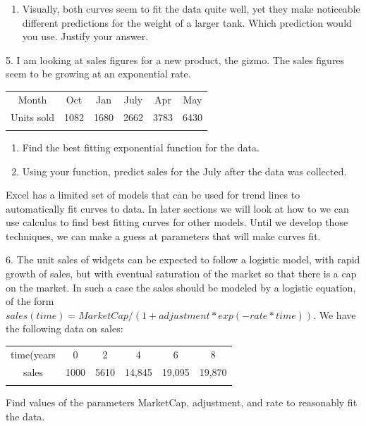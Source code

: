 \documentclass[10pt,]{book}
\theoremstyle{plain}
\theoremstyle{definition}
\theoremstyle{definition}
\newcommand{\hrulethin}  {\noalign{\hrule height 0.04em}}
\newcommand{\hrulemedium}{\noalign{\hrule height 0.07em}}
\newcommand{\hrulethick} {\noalign{\hrule height 0.11em}}
\begin{document}
\begin{exerciselist}
\begin{enumerate}[label=(\alph*)]
\item\hypertarget{li-92}{} Visually, both curves seem to fit the data quite well, yet they make noticeable different predictions for the weight of a larger tank.  Which prediction would you use.  Justify your answer.%
\end{enumerate}
\par\smallskip
\item[5.]\hypertarget{exercise-68}{}  I am looking at sales figures for a new product, the gizmo.  The sales figures seem to be growing at an exponential rate.
%
\leavevmode%
\begin{table}
\centering
\begin{tabular}{cccccc}\hrulethick
Month&Oct&Jan&July&Apr&May\tabularnewline\hrulethin
Units sold&1082&1680&2662&3783&6430\tabularnewline\hrulemedium
\end{tabular}
\end{table}
\leavevmode%
\begin{enumerate}[label=(\alph*)]
\item\hypertarget{li-93}{} Find the best fitting exponential function for the data.%
\item\hypertarget{li-94}{} Using your function, predict sales for the July after the data was collected.%
\end{enumerate}
\par\smallskip
Excel has a limited set of models that can be used for trend lines to automatically fit curves to data.  In later sections we will look at how to we can use calculus to find best fitting curves for other models.  Until we develop those techniques, we can make a guess at parameters that will make curves fit.  
%
\item[6.]\hypertarget{exercise-69}{}  The unit sales of widgets can be expected to follow a logistic model, with rapid growth of sales, but with eventual saturation of the market so that there is a cap on the market.  In such a case the sales should be modeled by a logistic equation, of the form
\(sales(time)=MarketCap/(1+adjustment*exp(-rate*time)).\)
We have the following data on sales:%
\leavevmode%
\begin{table}
\centering
\begin{tabular}{cccccc}\hrulethick
time(years&0&2&4&6&8\tabularnewline\hrulethin
sales&1000&5610&14,845&19,095&19,870\tabularnewline\hrulemedium
\end{tabular}
\end{table}
\par
Find values of the parameters MarketCap, adjustment, and rate to reasonably fit the data.

\end{exerciselist}
\end{document}

